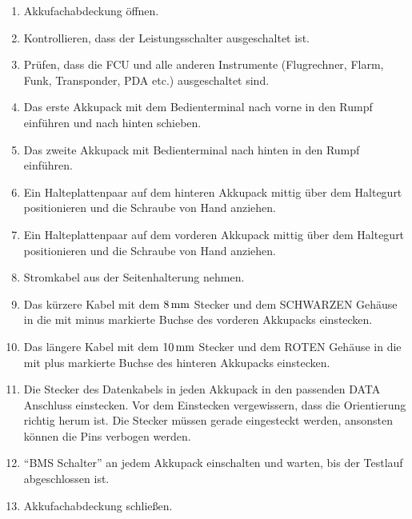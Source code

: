 \begin{enumerate}
\item Akkufachabdeckung öffnen.
\item Kontrollieren, dass der Leistungsschalter ausgeschaltet ist.
\item Prüfen, dass die FCU und alle anderen Instrumente (Flugrechner, Flarm, Funk,
Transponder, PDA etc.) ausgeschaltet sind.
\item Das erste Akkupack mit dem Bedienterminal nach vorne in den Rumpf einführen und nach hinten schieben.
\item Das zweite Akkupack mit Bedienterminal nach hinten in den Rumpf einführen.
\item Ein Halteplattenpaar auf dem hinteren Akkupack mittig über dem Haltegurt positionieren und die Schraube von Hand anziehen.
\item Ein Halteplattenpaar auf dem vorderen Akkupack mittig über dem Haltegurt positionieren und die Schraube von Hand anziehen.
\item Stromkabel aus der Seitenhalterung nehmen.
\item Das kürzere Kabel mit dem $\unit[8]{mm}$ Stecker und dem SCHWARZEN Gehäuse in die mit minus markierte Buchse des vorderen Akkupacks einstecken.
\item Das längere Kabel mit dem $\unit[10]{mm}$ Stecker und dem ROTEN Gehäuse in die mit plus markierte Buchse des hinteren Akkupacks einstecken.
\item Die Stecker des Datenkabels in jeden Akkupack in den passenden DATA Anschluss einstecken.
Vor dem Einstecken vergewissern, dass die Orientierung richtig herum ist.
Die Stecker müssen gerade eingesteckt werden, ansonsten können die Pins verbogen werden.
\item “BMS Schalter” an jedem Akkupack einschalten und warten, bis der Testlauf abgeschlossen ist.
\item Akkufachabdeckung schließen.
\end{enumerate}

